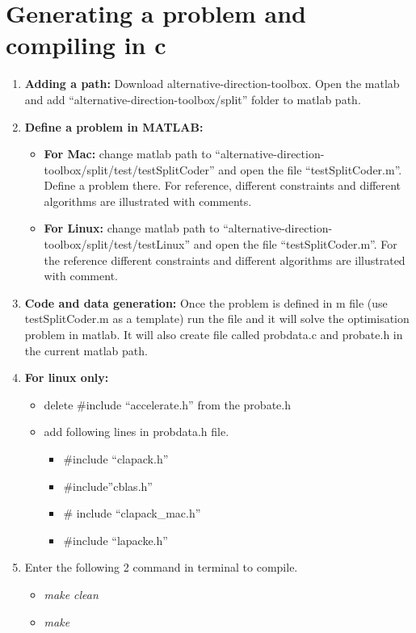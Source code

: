 \documentclass[]{article}
\begin{document}
\section{Generating a problem and compiling in c}
\begin{enumerate}
\item \textbf{Adding a path: } Download alternative-direction-toolbox.  Open the matlab and add “alternative-direction-toolbox/split” folder to matlab path.

\item \textbf{Define a problem in MATLAB: } 

\begin{itemize}
\item \textbf{For Mac: } change matlab path to “alternative-direction-toolbox/split/test/testSplitCoder” and  open the 	file “testSplitCoder.m”. Define a problem there. For reference, different constraints and different  algorithms are illustrated with comments.

\item \textbf{For Linux: } change matlab path to “alternative-direction-toolbox/split/test/testLinux” and  open the file “testSplitCoder.m”.  For the reference different constraints and different  algorithms are illustrated with comment.
\end{itemize}

\item \textbf{Code and data generation: }  Once the problem is defined in m file (use testSplitCoder.m as a template) run the file and it will solve the optimisation problem in matlab. It will also create file called probdata.c and probate.h in the current matlab path.

\item \textbf{For linux only: }   

\begin{itemize}
 \item  delete \#include “accelerate.h” from the probate.h 
\item  add following lines in probdata.h file. 

\begin{itemize}
\item                                 \#include “clapack.h” 
\item				 \#include”cblas.h” 
\item				\# include “clapack\_mac.h”
\item				\#include “lapacke.h” 
\end{itemize}
\end{itemize}

\item Enter the following 2 command in terminal to compile.

\begin{itemize}
\item \textit{make clean }
\item \textit{make}
\end{itemize}
\end{enumerate} 
\end{document}
